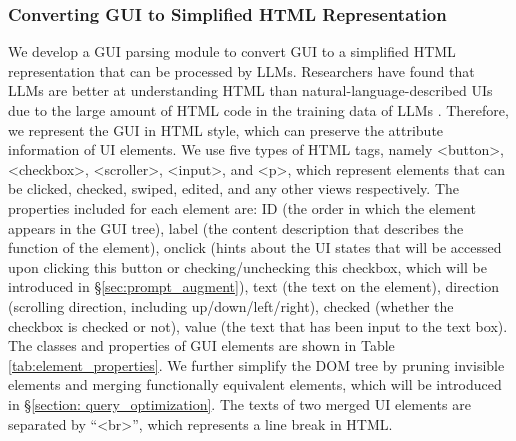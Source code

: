 \subsubsection{Converting GUI to Simplified HTML Representation} %
\label{sec:html_desc}
We develop a GUI parsing module to convert GUI to a simplified HTML representation that can be processed by LLMs. Researchers have found that LLMs are better at understanding HTML than natural-language-described UIs due to the large amount of HTML code in the training data of LLMs \cite{talking_with_ui}. %
Therefore, we represent the GUI in HTML style, which can preserve the attribute information of UI elements. We use five types of HTML tags, namely <button>, <checkbox>, <scroller>, <input>, and <p>, which represent elements that can be clicked, checked, swiped, edited, and any other views respectively. The properties included for each element are: ID (the order in which the element appears in the GUI tree), label (the content description that describes the function of the element), onclick (hints about the UI states that will be accessed upon clicking this button or checking/unchecking this checkbox, which will be introduced in \S\ref{sec:prompt_augment}), text (the text on the element), direction (scrolling direction, including up/down/left/right), checked (whether the checkbox is checked or not), value (the text that has been input to the text box). The classes and properties of GUI elements are shown in Table \ref{tab:element_properties}. %
We further simplify the DOM tree by pruning invisible elements and merging functionally equivalent elements, which will be introduced in \S \ref{section: query_optimization}. The texts of two merged UI elements are separated by ``<br>'', which represents a line break in HTML.

